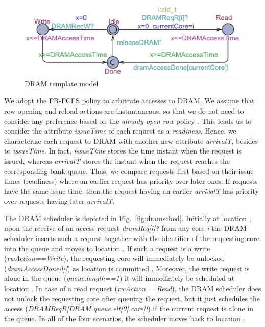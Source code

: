 
\begin{figure}[ht]
\centering
\vspace{-3mm}
\caption{DRAM template model}
\label{fig:dram}
\vspace{-2mm}
\includegraphics[scale=0.53]{DRAMMemory.pdf}
\vspace{-3mm}
\end{figure}

We adopt the FR-FCFS policy to arbitrate accesses to DRAM. We assume that row opening and reload actions are instantaneous, so that we do not need to consider any preference based on the \textit{already open row} policy \cite{Kim14}. This leads us to consider the attribute \emph{issueTime} of each request as a \textit{readiness}. Hence, we characterize each request to DRAM with another new attribute \emph{arrivalT}, besides to \emph{issueTime}. In fact, \emph{issueTime} stores the time instant when the request is issued, whereas \emph{arrivalT} stores the instant when the request reaches the corresponding bank queue. Thus, we compare requests first based on their issue times (readiness) where an earlier request has priority over later ones. If requests have the same issue time, then the request having an earlier \emph{arrivalT} has priority over requests having later \emph{arrivalT}. 

The DRAM scheduler is depicted in Fig.~\ref{fig:dramsched}. Initially at location , upon the receive of an access request \emph{dramReq[i]?} from any core \emph{i} the DRAM scheduler inserts such a request together with the identifier of the requesting core into the queue and moves to location . If such a request is a write (\emph{rwAction==Write}), the requesting core will immediately be unlocked (\emph{dramAccessDone[l]!}) as location is committed . Moreover, the write request is alone in the queue (\emph{queue.length==1}) it will immediately be scheduled at location .
In case of a read request (\emph{rwAction==Read}), the DRAM scheduler does not unlock the requesting core after queuing the request, but it just schedules the access (\emph{DRAMReqR[DRAM.queue.elt[0].core]!}) if the current request is alone in the queue. In all of the four scenarios, the scheduler moves back to location .

